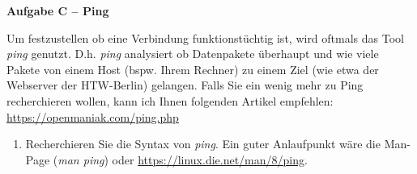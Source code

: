 \documentclass[paper=a4,fontsize=11pt]{scrartcl}%
\numberwithin{equation}{section}
\begin{document}
\begin{center}\Large{\textbf{Aufgabe C -- Ping}}\end{center}
Um festzustellen ob eine Verbindung funktionstüchtig ist, wird oftmals das Tool \emph{ping} genutzt. D.h. \emph{ping} analysiert ob Datenpakete überhaupt und wie viele Pakete von einem Host (bspw. Ihrem Rechner) zu einem Ziel (wie etwa der Webserver der HTW-Berlin) gelangen. Falls Sie ein wenig mehr zu Ping recherchieren wollen, kann ich Ihnen folgenden Artikel empfehlen: \url{https://openmaniak.com/ping.php}
\begin{enumerate}
	\item Recherchieren Sie die Syntax von \emph{ping}. Ein guter Anlaufpunkt wäre die Man-Page (\emph{man ping}) oder \url{https://linux.die.net/man/8/ping}.
\end{enumerate}


\end{document}
